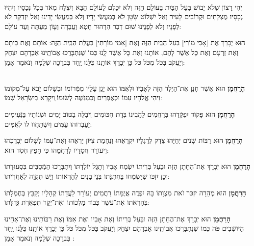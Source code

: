 \documentclass[twoside, openany, parskip=half, 11pt]{book}
\begin{document}
\begin{footnotesize}
\\
יְהִי רָצוֹן שֶׁלֹא יֵבוֹשׁ בַּעַל הַבַּיִת בָּעוֹלָם הַזֶּה וְלֹא יִכָּלֵם לָעוֹלָם הַבָּא וְיִצְלַח מְאֹד בְּכָל נְכָסָיו וְיִהְיוּ נְכָסָיו מֻצְלָחִים וּקְרוֹבִים לָעִיר וְאַל יִשְׁלוֹט שָׂטָן לֹא בְּמַעֲשֵׂי יָדָיו וְלֹא בְּמַעֲשֵׂי יָדֵינוּ וְאַל יִזְדַקֵּר לֹא לְפָנָיו וְלֹא לְפָנֵינוּ שׁוּם דְבַר הִרְהוּר חֵטְא וַעֲבֵרָה וְעָוֹן מֵעַתָּה וְעַד עוֹלָם:

\end{footnotesize}
 
 הוּא יְבָרֵךְ אֶת [אָבִי מוֹרִי] בַּעַל הַבַּֽיִת הַזֶּה וְאֶת [אִמִּי מוֹרָתִי] בַּעֲלַת הַבַּֽיִת הַזֶּה: אוֹתָם וְאֶת בֵּיתָם וְאֶת זַרְעָם וְאֶת כָּל אַשֶׁר לָהֶם, אוֹתָנוּ וְאֶת כָּל אַשֶׁר לָֽנוּ כְּמוֹ שֶׁנִּתְבָּרֲכוּ אֲבוֹתֵֽינוּ אַבְרָהָם יִצְחָק וְיַעֲקֹב בַּכֹּל מִכֹּל כֹּל כֵּן יְבָרֵךְ אוֹתָֽנוּ כֻּלָּנוּ יַֽחַד בִּבְרָכָה שְׁלֵמָה וְנֹאמַר אָמֵן:

\begin{sometimes}

\\
	\textbf{הָרַחֲמָן}
	 הוּא אֲשֶׁר חָנַן אֶת־הַיֶּלֶד הַזֶּה לְאָבִיו וּלְאִמּוֹ הוּא יָגֵן עָלָיו מִמְּֿרוֹמוֹ וּבְשָׁלוֹם יָבֹא עַל־מְקוֹמוֹ וִיהִי אֱלֹהָיו עִמּוֹ וּכְאֶפְרַיִם וְכִמְנַשֶּׁה לְשׂוּמוֹ ְויִקָּרֵא בְיִשְׂרָאֵל שְׁמוֹ:
	 
	\textbf{הָרַחֲמָן}
	 הוּא פָּקוֹד יִפְקְֿדֵהוּ בְּרַחֲמִים לַהֲבִינוֹ בְּדָת חִכּוּמִים וִיבַלֶּה בַטּוֹב יָמִים וּשְׁנוֹתָיו בַּנְּֿעִימִים יַעַבְדוּהוּ עַמִּים וְיִשְׁתַּחֲווּ לוֹ לְאֻמִּים: 
	
	\textbf{הָרַחֲמָן}
	 הוּא רַבּוֹת שָׁנִים יְחַיֵּהוּ צֶדֶק לְרַגְלָיו יִקְרָאֵהוּ וְנֶחָמַת צִיּוֹן יַרְאֵהוּ וְאֶת־עַמּוֹ לְשָׁלוֹם יְבָרֲכֵהוּ וִיעוֹרֵר חֲסָדָיו לְרַחֲמֵהוּ כִּי חָפֵץ חֶסֶד הוּא: 
	
	\textbf{הָרַחֲמָן}
	 הוּא יְבָרֵךְ אֶת־הֶחָתָן הַזֶּה וּבַעַל בְּרִיתוֹ יִשְׂמַח אָבִיו וְתָגֵל יוֹלַדְתּוֹ וְיִתְבָּרַכוּ הַמְֿסֻבִּים בִּסְעוּדָתוֹ וְכֵן יִזְכּוּ שֶׁיִּשְׂמְֿחוּ בַּחֲתֻנָּתוֹ בְּנֵי בָנִים לְהַרְאוֹתוֹ וְיֵשׁ תִּקְוָה לְאַחֲרִיתוֹ: 
	
	\textbf{הָרַחֲמָן}
	 הוּא מְהֵרָה יִזְכֹּר זֹאת מִצְוָתוֹ בָּהּ יִפְדֶה אֲיֻמָּתוֹ רַחֲמִים יְעוֹרֵר לַעֲדָתוֹ קְהָלָיו יְקַבֵּץ בְּחֶמְלָתוֹ בְּהַרְאֹתוֹ אֶת־עֹשֶׁר כְּבוֹד מַלְכוּתוֹ וְאֶת־יְקָר תִּפְאֶרֶת גְּדֻלָּתוֹ: 
	
	\textbf{הָרַחֲמָן}
	 הוּא יְבָרֵךְ אֶת־הֶחָתָן הַזֶּה וּבַּעַל בְּרִיתוֹ וְאֶת אָבִיו וְאֶת אִמּוֹ וְאֶת רַבּוֹתֵינוּ וְאֶת־אַחֵינוּ הַיּוֹשְֿׁבִים פֹּה כְּמוֹ שֶׁנִתְבָּרֲכוּ אֲבוֹתֵֽינוּ אַבְרָהָם יִצְחָק וְיַעֲקֹב בַּכֹּל מִכֹּל כֹּל כֵּן יְבָרֵךְ אוֹתָֽנוּ כֻּלָּנוּ יַֽחַד בִּבְרָכָה שְׁלֵמָה וְנֹאמַר אָמֵן
	 :

\end{sometimes}
\end{document}
